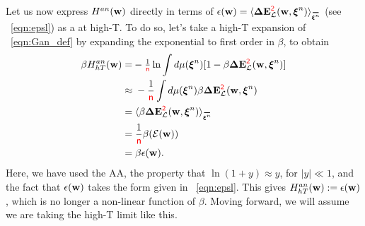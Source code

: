 

Let us now express $H^{an}({\mathbf{w}})$ directly in terms of $\EPSLw=\langle\DETOPXI \rangle_{\AVGNDXIn}$ (see \EQN~\ref{eqn:epsl}) as a \ThermalAverage at high-T.
To do so, let's take a high-T expansion of \EQN~\ref{eqn:Gan_def} 
by expanding the exponential to first order in $\beta$, to obtain
\begin{align}
\label{eqn:Gan_highT}
\beta\GANHT
=&  - \tfrac{1}{\ND}\ln \int d\mu(\NDXIn) [1-\beta \DETOPXI] \\ \nonumber
\approx&\;   - \frac{1}{\ND} \int d\mu(\NDXIn)\beta \DETOPXI \\ \nonumber
=&\;\langle \beta\DETOPXI \rangle_{\AVGNDXIn} \\ \nonumber
=&\;\frac{1}{\ND}\beta(\DETOT)\\ 
\label{eqn:Gan_highT_final}
=&\;\beta \EPSLw  .
\end{align}
Here, we have used the AA, the property that $\ln(1 + y) \approx y$, for $|y| \ll 1$, and the fact that $\epsilon({\mathbf{w}})$ takes the form given in \EQN~\ref{eqn:epsl}.
This gives $H^{an}_{hT}({\mathbf{w}}):=\epsilon({\mathbf{w}})$, which is no longer a non-linear function of $\beta$.
Moving forward, we will assume we are taking the high-T limit like this.

